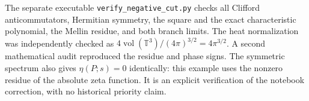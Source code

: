 \begin{remark}\oursComputed
The separate executable \texttt{verify\_negative\_cut.py} checks all
Clifford anticommutators, Hermitian symmetry, the square and the exact
characteristic polynomial, the Mellin residue, and both branch limits.
The heat normalization was independently checked as
\(4\operatorname{vol}(\mathbb T^3)/(4\pi)^{3/2}=4\pi^{3/2}\).
A second mathematical audit reproduced the residue and phase signs.
The symmetric spectrum also gives \(\eta(P;s)=0\) identically:
this example uses the nonzero residue of the absolute zeta function.
It is an explicit verification of the notebook correction, with no
historical priority claim.
\end{remark}

